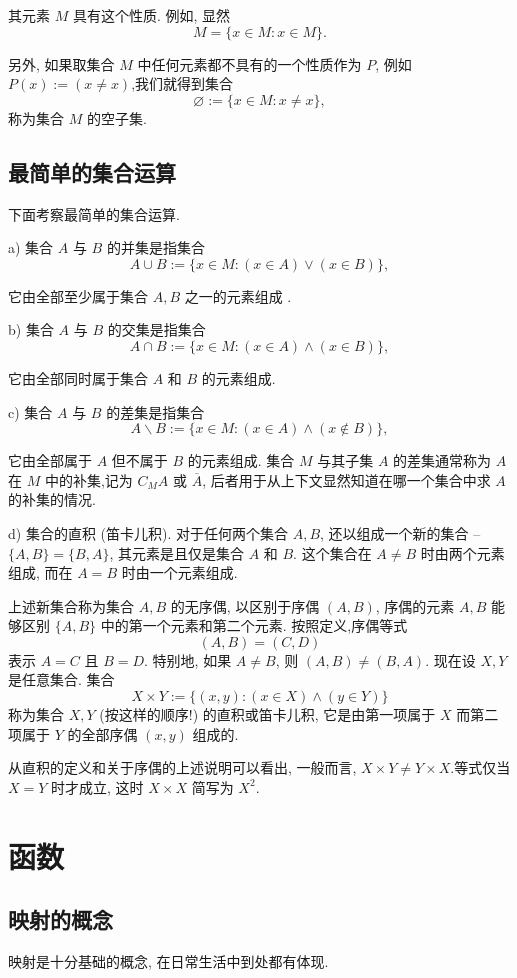 \documentclass{ctexart}
\begin{document}
其元素 $M$ 具有这个性质.
例如, 显然
$$
M=\{x \in M : x \in M\} .
$$

另外, 如果取集合 $M$ 中任何元素都不具有的一个性质作为 $P$, 例如 $P(x):=(x \neq x)$,我们就得到集合
$$
\varnothing:=\{x \in M : x \neq x\},
$$
称为集合 $M$ 的空子集.

\subsection{最简单的集合运算} 下面考察最简单的集合运算.

a) 集合 $A$ 与 $B$ 的并集是指集合
$$
A \cup B:=\{x \in M :(x \in A) \vee(x \in B)\},
$$

它由全部至少属于集合 $A, B$ 之一的元素组成 .

b) 集合 $A$ 与 $B$ 的交集是指集合
$$
A \cap B:=\{x \in M :(x \in A) \wedge(x \in B)\},
$$

它由全部同时属于集合 $A$ 和 $B$ 的元素组成.

c) 集合 $A$ 与 $B$ 的差集是指集合
$$
A \backslash B:=\{x \in M :(x \in A) \wedge(x \notin B)\},
$$

它由全部属于 $A$ 但不属于 $B$ 的元素组成.
集合 $M$ 与其子集 $A$ 的差集通常称为 $A$ 在 $M$ 中的补集,记为 $C_M A$ 或 $\overline{A}$, 后者用于从上下文显然知道在哪一个集合中求 $A$ 的补集的情况.

d) 集合的直积 (笛卡儿积). 对于任何两个集合 $A, B$, 还以组成一个新的集合 -- $\{A, B\}=\{B, A\}$, 其元素是且仅是集合 $A$ 和 $B$. 这个集合在 $A \neq B$ 时由两个元素组成, 而在 $A=B$ 时由一个元素组成.

上述新集合称为集合 $A, B$ 的无序偶, 以区别于序偶 $(A, B)$, 序偶的元素 $A, B$ 能够区别 $\{A, B\}$ 中的第一个元素和第二个元素. 按照定义,序偶等式
$$
(A, B)=(C, D)
$$
表示 $A=C$ 且 $B=D$. 特别地, 如果 $A \neq B$, 则 $(A, B) \neq(B, A)$.
现在设 $X, Y$ 是任意集合. 集合
$$
X \times Y:=\{(x, y) : (x \in X) \wedge(y \in Y)\}
$$
称为集合 $X, Y$ (按这样的顺序!) 的直积或笛卡儿积, 它是由第一项属于 $X$ 而第二项属于 $Y$ 的全部序偶 $(x, y)$ 组成的.

从直积的定义和关于序偶的上述说明可以看出, 一般而言, $X \times Y \neq Y \times X$.等式仅当 $X=Y$ 时才成立, 这时 $X \times X$ 简写为 $X^2$.


\section{函数} 

\subsection{映射的概念} 映射是十分基础的概念, 在日常生活中到处都有体现.  
\end{document}
